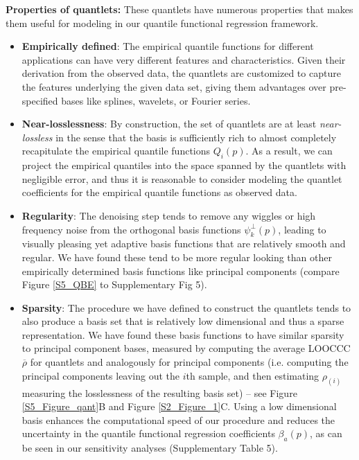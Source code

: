 \documentclass[11pt]{article}
\begin{document}
\textbf{Properties of quantlets:}  These quantlets have numerous properties that makes them useful for modeling in our quantile functional regression framework.
\begin{itemize}
\item \textbf{Empirically defined}:  The empirical quantile functions for different applications can have very different features and characteristics.  Given their derivation from the observed data, the quantlets are customized to capture the features underlying the given data set, giving them advantages over pre-specified bases like splines, wavelets, or Fourier series.

\item \textbf{Near-losslessness}: By construction, the set of quantlets are at least \textit{near-lossless} in the sense that the basis is sufficiently rich to almost completely recapitulate the empirical quantile functions $Q_i(p)$.  As a result, we can project the empirical quantiles into the space spanned by the quantlets with negligible error, and thus it is reasonable to consider modeling the quantlet coefficients for the empirical quantile functions as observed data.

\item \textbf{Regularity}: The denoising step tends to remove any wiggles or high frequency noise from the orthogonal basis functions $\psi^\perp_k(p)$, leading to visually pleasing yet adaptive basis functions that are relatively smooth and regular.  We have found these tend to be more regular looking than other empirically determined basis functions like principal components  (compare Figure \ref{S5_QBE} to Supplementary Fig 5).

\item \textbf{Sparsity}: The procedure we have defined to construct the quantlets tends to also produce a basis set that is relatively low dimensional and thus a sparse representation.  We have found these basis functions to have similar sparsity to principal component bases, measured by computing the average LOOCCC $\overline{\rho}$ for quantlets and analogously for principal components (i.e. computing the principal components leaving out the $i$th sample, and then estimating $\rho_{(i)}$ measuring the losslessness of the resulting basis set) -- see Figure \ref{S5_Figure_qant}B and Figure \ref{S2_Figure_1}C.  Using a low dimensional basis enhances the computational speed of our procedure and reduces the uncertainty in the quantile functional regression coefficients $\beta_a(p)$, as can be seen in our sensitivity analyses (Supplementary Table 5).


\end{itemize}
\end{document}
